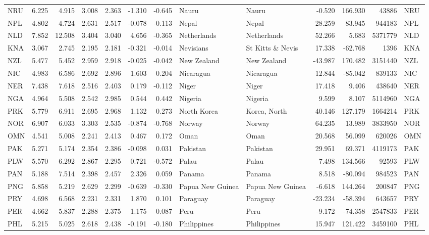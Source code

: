 \begin{tabular}{lrrrrrrllrrrl}
NRU & 6.225 & 4.915 & 3.008 & 2.363 & -1.310 & -0.645 & Nauru & Nauru & -0.520 & 166.930 & 43886 & NRU \\
NPL & 4.802 & 4.724 & 2.631 & 2.517 & -0.078 & -0.113 & Nepal & Nepal & 28.259 & 83.945 & 944183 & NPL \\
NLD & 7.852 & 12.508 & 3.404 & 3.040 & 4.656 & -0.365 & Netherlands & Netherlands & 52.266 & 5.683 & 5371779 & NLD \\
KNA & 3.067 & 2.745 & 2.195 & 2.181 & -0.321 & -0.014 & Nevisians & St Kitts \& Nevis & 17.338 & -62.768 & 1396 & KNA \\
NZL & 5.477 & 5.452 & 2.959 & 2.918 & -0.025 & -0.042 & New Zealand & New Zealand & -43.987 & 170.482 & 3151440 & NZL \\
NIC & 4.983 & 6.586 & 2.692 & 2.896 & 1.603 & 0.204 & Nicaragua & Nicaragua & 12.844 & -85.042 & 839133 & NIC \\
NER & 7.438 & 7.618 & 2.516 & 2.403 & 0.179 & -0.112 & Niger & Niger & 17.418 & 9.406 & 438640 & NER \\
NGA & 4.964 & 5.508 & 2.542 & 2.985 & 0.544 & 0.442 & Nigeria & Nigeria & 9.599 & 8.107 & 5114960 & NGA \\
PRK & 5.779 & 6.911 & 2.695 & 2.968 & 1.132 & 0.273 & North Korea & Korea, North & 40.146 & 127.179 & 1664214 & PRK \\
NOR & 6.907 & 6.033 & 3.303 & 2.535 & -0.874 & -0.768 & Norway & Norway & 64.235 & 13.989 & 3833950 & NOR \\
OMN & 4.541 & 5.008 & 2.241 & 2.413 & 0.467 & 0.172 & Oman & Oman & 20.568 & 56.099 & 620026 & OMN \\
PAK & 5.271 & 5.174 & 2.354 & 2.386 & -0.098 & 0.031 & Pakistan & Pakistan & 29.951 & 69.371 & 4119173 & PAK \\
PLW & 5.570 & 6.292 & 2.867 & 2.295 & 0.721 & -0.572 & Palau & Palau & 7.498 & 134.566 & 92593 & PLW \\
PAN & 5.188 & 7.514 & 2.398 & 2.457 & 2.326 & 0.059 & Panama & Panama & 8.518 & -80.094 & 984523 & PAN \\
PNG & 5.858 & 5.219 & 2.629 & 2.299 & -0.639 & -0.330 & Papua New Guinea & Papua New Guinea & -6.618 & 144.264 & 200847 & PNG \\
PRY & 4.698 & 6.568 & 2.231 & 2.331 & 1.870 & 0.101 & Paraguay & Paraguay & -23.234 & -58.394 & 643657 & PRY \\
PER & 4.662 & 5.837 & 2.288 & 2.375 & 1.175 & 0.087 & Peru & Peru & -9.172 & -74.358 & 2547833 & PER \\
PHL & 5.215 & 5.025 & 2.618 & 2.438 & -0.191 & -0.180 & Philippines & Philippines & 15.947 & 121.422 & 3459100 & PHL \\

\end{tabular}
